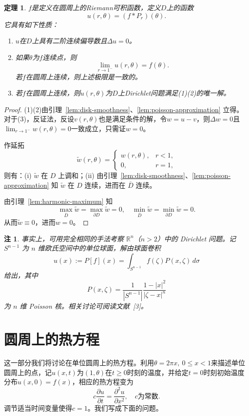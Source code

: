 \documentclass[UTF8,zihao=5,linespread=1.34]{ctexart}
\theoremstyle{cnplain}
\newtheorem{theorem}{定理}[section]
\theoremstyle{cnremark}
\newtheorem*{remark}{注}
\begin{document}
\begin{theorem}\label{thm:disk-dirichlet}
$f$是定义在圆周上的Riemann可积函数，定义$D$上的函数
\[
u(r,\theta) = (f * P_r)(\theta).
\]
它具有如下性质：
\begin{enumerate}
\item $u$在$D$上具有二阶连续偏导数且$\Delta u = 0$。
\item 如果$\theta$为$f$连续点，则
\[
\lim_{r \rightarrow 1^{-}} u(r,\theta) = f(\theta).
\]
若$f$在圆周上连续，则上述极限是一致的。
\item 若$f$在圆周上连续，则$u(r,\theta)$为$D$上Dirichlet问题满足(1)(2)的唯一解。
\end{enumerate}
\end{theorem}

\begin{proof}
(1)(2)由引理~\ref{lem:disk-smoothness}、\ref{lem:poisson-approximation} 立得。对于(3)，反证法，反设$v(r,\theta)$也是满足条件的解，令$w = u - v$，则$\Delta w = 0$且$\lim_{r \rightarrow 1^{-}} w(r,\theta) = 0$一致成立，只需证$w = 0$。

作延拓
\[
\widetilde{w}(r,\theta) = 
\begin{cases}
w(r,\theta), & r < 1, \\
0, & r = 1,
\end{cases}
\]
则有：(i) $\widetilde{w}$ 在 $D$ 上调和；(ii) 由引理~\ref{lem:disk-smoothness}、\ref{lem:poisson-approximation} 知 $\widetilde{w}$ 在 $D$ 连续，进而在 $\overline{D}$ 连续。

由引理~\ref{lem:harmonic-maximum} 知
\[
\max_{\overline{D}}\widetilde{w} = \max_{\partial D}\widetilde{w} = 0,\quad
\min_{\overline{D}}\widetilde{w} = \min_{\partial D}\widetilde{w} = 0.
\]
从而$\widetilde{w} \equiv 0$，进而$w = 0$。
\end{proof}

\begin{remark}
事实上，可用完全相同的手法考察 $\mathbb{R}^{n}$（$n>2$）中的 Dirichlet 问题。记 $S^{n-1}$ 为 $n$ 维欧氏空间中的单位球面，解由球面卷积
\[
u(x) := P[f](x) = \int_{S^{n-1}} f(\zeta) P(x,\zeta)\,d\sigma
\]
给出，其中
\[
P(x,\zeta) = \frac{1}{|S^{n-1}|}\frac{1 - |x|^{2}}{|\zeta - x|^{n}}
\]
为 $n$ 维 Poisson 核。相关讨论可阅读文献~[3]。
\end{remark}

\newpage
\section{圆周上的热方程}

这一部分我们将讨论在单位圆周上的热方程。利用$\theta = 2\pi x,\ 0 \leq x < 1$来描述单位圆周上的点，记$u(x,t)$为$(1,\theta)$在$t \geq 0$时刻的温度，并给定$t = 0$时刻初始温度分布$u(x,0) = f(x)$，相应的热方程变为
\[
c\frac{\partial u}{\partial t} = \frac{\partial^{2}u}{\partial x^{2}},\quad c\text{为常数}.
\]
调节适当时间变量使得$c = 1$。我们写成下面的问题。
\end{document}
